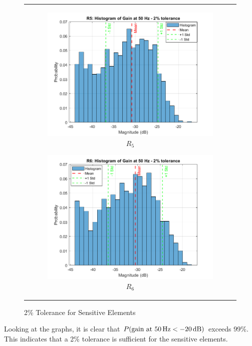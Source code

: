 \documentclass[hidelinks,12pt]{article}
\begin{document}
\begin{figure}[!h]
{\begin{tabular}{c}
				\begin{subfigure}[h]{0.4\textwidth}
					\centering
					\includegraphics[width=\textwidth]{figures/2_percent/r5.png}
					\caption{$R_5$}
				\end{subfigure}
				\hfill
				\begin{subfigure}[h]{0.4\textwidth}
					\centering
					\includegraphics[width=\textwidth]{figures/2_percent/r6.png}
					\caption{$R_6$}
				\end{subfigure}
			\end{tabular}
		}
		\caption{2\% Tolerance for Sensitive Elements}
	\end{figure}
	
	 Looking at the graphs, it is clear that \( P(\text{gain at 50\,Hz} < -20\,\text{dB})\) exceeds 99\%. This indicates that a 2\% tolerance is sufficient for the sensitive elements.
\end{document}
